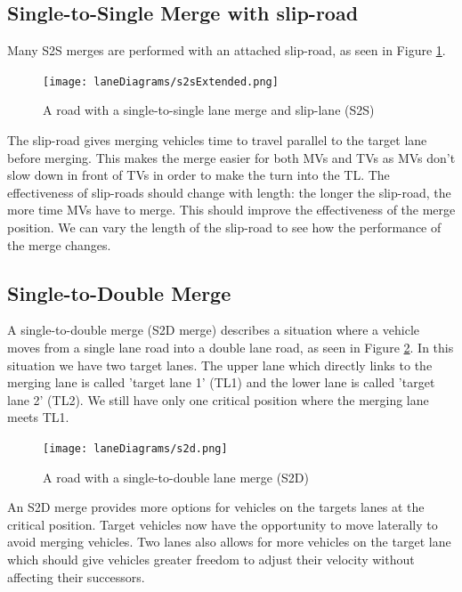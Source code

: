 \subsection{Single-to-Single Merge with slip-road}
\label{subsec:Single-to-Single Merge with slip-road}
Many S2S merges are performed with an attached slip-road, as seen in Figure \ref{fig:S2SMergeExtended}.

\begin{figure}[htb]{}
\texttt{[image: laneDiagrams/s2sExtended.png]}
\caption{A road with a single-to-single lane merge and slip-lane (S2S)}
\label{fig:S2SMergeExtended}
\end{figure}

The slip-road gives merging vehicles time to travel parallel to the target lane before merging. This makes the merge easier for both MVs and TVs as MVs don't slow down in front of TVs in order to make the turn into the TL. The effectiveness of slip-roads should change with length: the longer the slip-road, the more time MVs have to merge. This should improve the effectiveness of the merge position. We can vary the length of the slip-road to see how the performance of the merge changes.

\subsection{Single-to-Double Merge}
\label{subsec:Single-to-Double Merge}
A single-to-double merge (S2D merge) describes a situation where a vehicle moves from a single lane road into a double lane road, as seen in Figure \ref{fig:S2DMerge}. In this situation we have two target lanes. The upper lane which directly links to the merging lane is called 'target lane 1' (TL1) and the lower lane is called 'target lane 2' (TL2). We still have only one critical position where the merging lane meets TL1.

\begin{figure}[htb]
\texttt{[image: laneDiagrams/s2d.png]}
\caption{A road with a single-to-double lane merge (S2D)}
\label{fig:S2DMerge}
\end{figure}

An S2D merge provides more options for vehicles on the targets lanes at the critical position. Target vehicles now have the opportunity to move laterally to avoid merging vehicles. Two lanes also allows for more vehicles on the target lane which should give vehicles greater freedom to adjust their velocity without affecting their successors.

